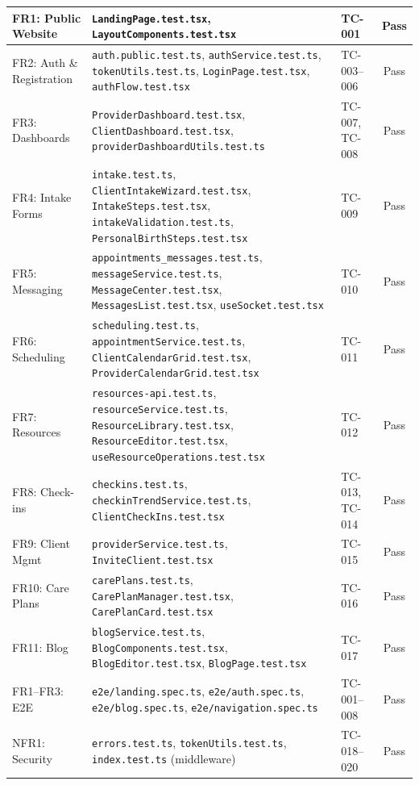 \documentclass[12pt,letterpaper]{article}
\begin{document}
{\begin{longtable}{|>{\raggedright\arraybackslash}p{2cm}|>{\raggedright\arraybackslash}p{5.5cm}|>{\raggedright\arraybackslash}p{2cm}|c|}
FR1: Public Website & \texttt{LandingPage.test.tsx}, \texttt{LayoutComponents.test.tsx} & TC-001 & Pass \\
\hline
\rowcolor{TableRowAlt}
FR2: Auth \& Registration & \texttt{auth.public.test.ts}, \texttt{authService.test.ts}, \texttt{tokenUtils.test.ts}, \texttt{LoginPage.test.tsx}, \texttt{authFlow.test.tsx} & TC-003--006 & Pass \\
\hline
FR3: Dashboards & \texttt{ProviderDashboard.test.tsx}, \texttt{ClientDashboard.test.tsx}, \texttt{providerDashboardUtils.test.ts} & TC-007, TC-008 & Pass \\
\hline
\rowcolor{TableRowAlt}
FR4: Intake Forms & \texttt{intake.test.ts}, \texttt{ClientIntakeWizard.test.tsx}, \texttt{IntakeSteps.test.tsx}, \texttt{intakeValidation.test.ts}, \texttt{PersonalBirthSteps.test.tsx} & TC-009 & Pass \\
\hline
FR5: Messaging & \texttt{appointments\_messages.test.ts}, \texttt{messageService.test.ts}, \texttt{MessageCenter.test.tsx}, \texttt{MessagesList.test.tsx}, \texttt{useSocket.test.tsx} & TC-010 & Pass \\
\hline
\rowcolor{TableRowAlt}
FR6: Scheduling & \texttt{scheduling.test.ts}, \texttt{appointmentService.test.ts}, \texttt{ClientCalendarGrid.test.tsx}, \texttt{ProviderCalendarGrid.test.tsx} & TC-011 & Pass \\
\hline
FR7: Resources & \texttt{resources-api.test.ts}, \texttt{resourceService.test.ts}, \texttt{ResourceLibrary.test.tsx}, \texttt{ResourceEditor.test.tsx}, \texttt{useResourceOperations.test.tsx} & TC-012 & Pass \\
\hline
\rowcolor{TableRowAlt}
FR8: Check-ins & \texttt{checkins.test.ts}, \texttt{checkinTrendService.test.ts}, \texttt{ClientCheckIns.test.tsx} & TC-013, TC-014 & Pass \\
\hline
FR9: Client Mgmt & \texttt{providerService.test.ts}, \texttt{InviteClient.test.tsx} & TC-015 & Pass \\
\hline
\rowcolor{TableRowAlt}
FR10: Care Plans & \texttt{carePlans.test.ts}, \texttt{CarePlanManager.test.tsx}, \texttt{CarePlanCard.test.tsx} & TC-016 & Pass \\
\hline
FR11: Blog & \texttt{blogService.test.ts}, \texttt{BlogComponents.test.tsx}, \texttt{BlogEditor.test.tsx}, \texttt{BlogPage.test.tsx} & TC-017 & Pass \\
\hline
\rowcolor{TableRowAlt}
FR1--FR3: E2E & \texttt{e2e/landing.spec.ts}, \texttt{e2e/auth.spec.ts}, \texttt{e2e/blog.spec.ts}, \texttt{e2e/navigation.spec.ts} & TC-001--008 & Pass \\
\hline
NFR1: Security & \texttt{errors.test.ts}, \texttt{tokenUtils.test.ts}, \texttt{index.test.ts} (middleware) & TC-018--020 & Pass \\
\hline
\end{longtable}
}
\end{document}
